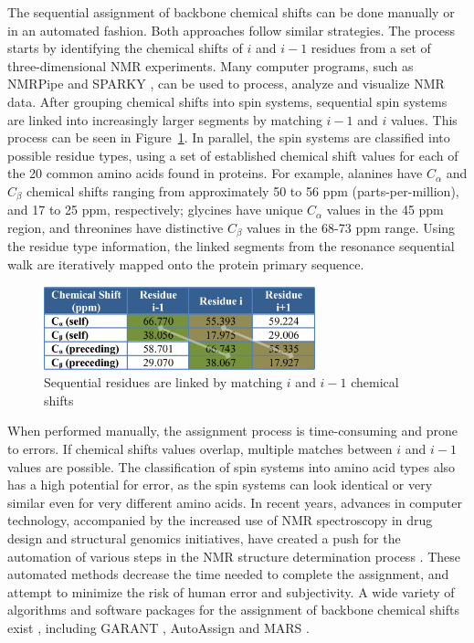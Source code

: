 \documentclass{article}
\begin{document}
\indent The sequential assignment of backbone chemical shifts can be done manually or in an automated fashion. Both approaches follow similar strategies. The process starts by identifying the chemical shifts of $i$ and $i-1$ residues from a set of three-dimensional NMR experiments. Many computer programs, such as NMRPipe \cite{nmrpipe} and SPARKY \cite{goddard}, can be used to process, analyze and visualize NMR data. After grouping chemical shifts into spin systems, sequential spin systems are linked into increasingly larger segments by matching $i-1$ and $i$ values. This process can be seen in Figure~\ref{fig:joel_figure}. In parallel, the spin systems are classified into possible residue types, using a set of established chemical shift values for each of the 20 common amino acids found in proteins. For example, alanines have $C_{\alpha}$ and $C_{\beta}$ chemical shifts ranging from approximately 50 to 56 ppm (parts-per-million), and 17 to 25 ppm, respectively; glycines have unique $C_{\alpha}$ values in the 45 ppm region, and threonines have distinctive $C_{\beta}$ values in the 68-73 ppm range\cite{wishart, wang}. Using the residue type information, the linked segments from the resonance sequential walk are iteratively mapped onto the protein primary sequence. 

\begin{figure}[!h]
	\begin{center}
		\includegraphics[keepaspectratio=true, width=0.7\textwidth]{residue_thingy}
	\caption{Sequential residues are linked by matching $i$ and $i-1$ chemical shifts}
	\label{fig:joel_figure}
	\end{center}
\end{figure}

\indent When performed manually, the assignment process is time-consuming and prone to errors. If chemical shifts values overlap, multiple matches between $i$ and $i-1$ values are possible. The classification of spin systems into amino acid types also has a high potential for error, as the spin systems can look identical or very similar even for very different amino acids. In recent years, advances in computer technology, accompanied by the increased use of NMR spectroscopy in drug design and structural genomics initiatives, have created a push for the automation of various steps in the NMR structure determination process \cite{moseley}. These automated methods decrease the time needed to complete the assignment, and attempt to minimize the risk of human error and subjectivity. A wide variety of algorithms and software packages for the assignment of backbone chemical shifts exist \cite{guntert}, including GARANT \cite{garant}, AutoAssign \cite{moseley,zimmerman} and MARS \cite{mars}.
\end{document}

